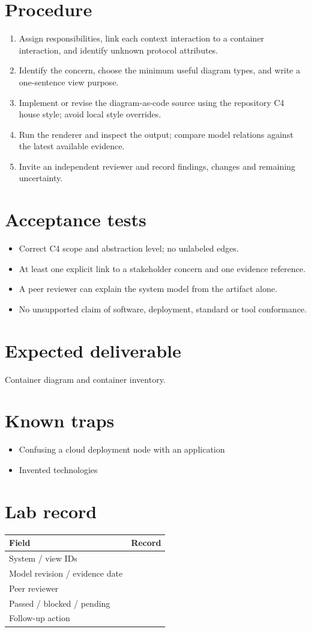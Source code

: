 \documentclass[10pt,letterpaper]{article}
\begin{document}
\section{Procedure}
\begin{enumerate}
\item Assign responsibilities, link each context interaction to a container interaction, and identify unknown protocol attributes.
\item Identify the concern, choose the minimum useful diagram types, and write a one-sentence view purpose.
\item Implement or revise the diagram-as-code source using the repository C4 house style; avoid local style overrides.
\item Run the renderer and inspect the output; compare model relations against the latest available evidence.
\item Invite an independent reviewer and record findings, changes and remaining uncertainty.
\end{enumerate}

\section{Acceptance tests}
\begin{itemize}
\item Correct C4 scope and abstraction level; no unlabeled edges.
\item At least one explicit link to a stakeholder concern and one evidence reference.
\item A peer reviewer can explain the system model from the artifact alone.
\item No unsupported claim of software, deployment, standard or tool conformance.
\end{itemize}

\section{Expected deliverable}
Container diagram and container inventory.


\section{Known traps}
\begin{itemize}
\item Confusing a cloud deployment node with an application
\item Invented technologies
\end{itemize}

\section{Lab record}
\begin{tabularx}{\linewidth}{@{}YY@{}}\toprule
\textbf{Field} & \textbf{Record} \\ \midrule
System / view IDs &  \\
Model revision / evidence date &  \\
Peer reviewer &  \\
Passed / blocked / pending &  \\
Follow-up action &  \\
\bottomrule\end{tabularx}
\end{document}
